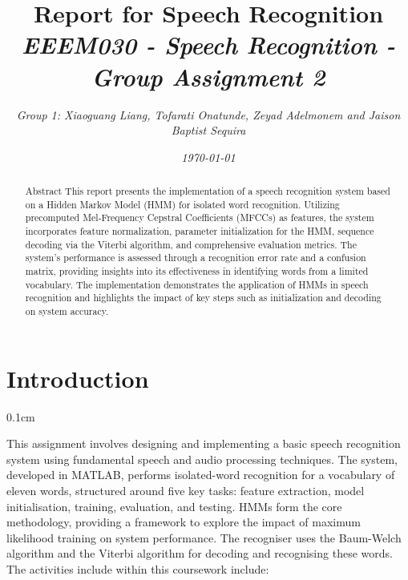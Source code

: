 \documentclass{article}
\newcommand{\setParDis}{\setlength {\parskip} {0.1cm} } %
\begin{document}
\title{%
Report for Speech Recognition \\
\large\itshape{EEEM030 - Speech Recognition - Group Assignment 2}}
\author{\normalsize\slshape{Group 1: Xiaoguang Liang, Tofarati Onatunde, Zeyad Adelmonem and Jaison Baptist Sequira}}
\date{\normalsize\slshape\today}
\maketitle


\suppressfloats

\tableofcontents

\begin{abstract}
Abstract
This report presents the implementation of a speech recognition system based on a Hidden Markov Model (HMM) for isolated word recognition. Utilizing precomputed Mel-Frequency Cepstral Coefficients (MFCCs) as features, the system incorporates feature normalization, parameter initialization for the HMM, sequence decoding via the Viterbi algorithm, and comprehensive evaluation metrics. The system’s performance is assessed through a recognition error rate and a confusion matrix, providing insights into its effectiveness in identifying words from a limited vocabulary. The implementation demonstrates the application of HMMs in speech recognition and highlights the impact of key steps such as initialization and decoding on system accuracy.

\end{abstract}


\section{Introduction}
\setParDis

This assignment involves designing and implementing a basic speech recognition system using fundamental speech and audio processing techniques. The system, developed in MATLAB, performs isolated-word recognition for a vocabulary of eleven words, structured around five key tasks: feature extraction, model initialisation, training, evaluation, and testing. HMMs form the core methodology, providing a framework to explore the impact of maximum likelihood training on system performance. The recogniser uses the Baum-Welch algorithm and the Viterbi algorithm for decoding and recognising these words. The activities include within this coursework include:
\end{document}
